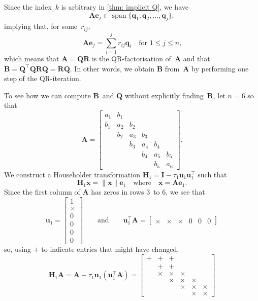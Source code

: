 \documentclass[12pt,a4paper]{article}
\newcommand{\bs}[1]{\boldsymbol{#1}}
\newcommand{\vecspan}{\operatorname{span}}
\begin{document}
Since the index~$k$ is arbitrary in \cref{thm: implicit Q}, we have
\[
\bs{A}\bs{e}_j\in\vecspan\{\bs{q}_1,\bs{q}_2,\ldots,\bs{q}_j\},
\]
implying that, for some~$r_{ij}$,
\[
\bs{A}\bs{e}_j=\sum_{i=1}^jr_{ij}\bs{q}_i\quad\text{for $1\le j\le n$,}
\]
which means that $\bs{A}=\bs{Q}\bs{R}$ is the QR-factorisation of~$\bs{A}$ and
that $\bs{B}=\bs{Q}^\top\bs{Q}\bs{R}\bs{Q}=\bs{R}\bs{Q}$.  In other words, we
obtain $\bs{B}$ from~$\bs{A}$ by performing one step of the QR-iteration.

To see how we can compute $\bs{B}$~and $\bs{Q}$ without explicitly
finding~$\bs{R}$, let $n=6$ so that
\[
\boldsymbol{A}=\begin{bmatrix}
a_1&b_1&   &   &   &   \\
b_1&a_2&b_2&   &   &   \\
   &b_2&a_3&b_3&   &   \\
   &   &b_3&a_4&b_4&   \\
   &   &   &b_4&a_5&b_5\\
   &   &   &   &b_5&a_6\end{bmatrix}.
\]
We construct a Householder transformation
$\boldsymbol{H}_1=\boldsymbol{I}-\tau_1\boldsymbol{u}_1\boldsymbol{u}_1^\top$
such that
\[
\boldsymbol{H}_1\boldsymbol{x}=\|\boldsymbol{x}\|\boldsymbol{e}_1
\quad\text{where}\quad\boldsymbol{x}
      =\boldsymbol{A}\boldsymbol{e}_1.
\]
Since the first column of $\boldsymbol{A}$ has zeros in rows $3$~to $6$, we see
that
\[
\boldsymbol{u}_1=\begin{bmatrix}1\\ \times\\ 0\\ 0\\ 0\\ 0\end{bmatrix}
\qquad\text{and}\qquad
\boldsymbol{u}_1^\top\boldsymbol{A}=\begin{bmatrix}
\times&\times&\times&0&0&0\end{bmatrix}
\]
so, using $+$ to indicate entries that might have changed,
\[
\boldsymbol{H}_1\boldsymbol{A}
=\boldsymbol{A}-\tau_1\boldsymbol{u}_1(\boldsymbol{u}_1^\top\boldsymbol{A})
      =\begin{bmatrix}
+&     +&     +&      &      &      \\
 &     +&     +&      &      &      \\
 &\times&\times&\times&      &      \\
 &      &\times&\times&\times&      \\
 &      &      &\times&\times&\times\\
 &      &      &      &\times&\times\end{bmatrix}
\]
\end{document}
